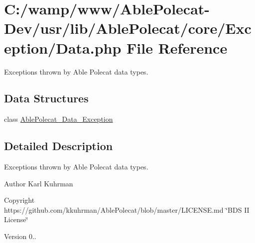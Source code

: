 \hypertarget{_exception_2_data_8php}{}\section{C\+:/wamp/www/\+Able\+Polecat-\/\+Dev/usr/lib/\+Able\+Polecat/core/\+Exception/\+Data.php File Reference}
\label{_exception_2_data_8php}


Exceptions thrown by Able Polecat data types.  


\subsection*{Data Structures}
\begin{DoxyCompactItemize}
\item 
class \hyperlink{class_able_polecat___data___exception}{Able\+Polecat\+\_\+\+Data\+\_\+\+Exception}
\end{DoxyCompactItemize}


\subsection{Detailed Description}
Exceptions thrown by Able Polecat data types. 

\begin{DoxyAuthor}{Author}
Karl Kuhrman 
\end{DoxyAuthor}
\begin{DoxyCopyright}{Copyright}
https\+://github.com/kkuhrman/\+Able\+Polecat/blob/master/\+L\+I\+C\+E\+N\+S\+E.\+md \char`\"{}\+B\+D\+S I\+I License\char`\"{} 
\end{DoxyCopyright}
\begin{DoxyVersion}{Version}
0.. 
\end{DoxyVersion}
